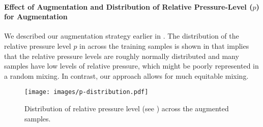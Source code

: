 \documentclass{article}
\begin{document}
\paragraph{Effect of Augmentation and Distribution of Relative Pressure-Level ($p$) for Augmentation}
We described our augmentation strategy earlier in . The distribution of the relative pressure level $p$ in  across the training samples is shown in  that implies that the relative pressure levels are roughly normally distributed and many samples have low levels of relative pressure, which might be poorly represented in a random mixing. In contrast, our approach allows for much equitable mixing.
\begin{figure}[ht]
    \centering
    \texttt{[image: images/p-distribution.pdf]}
    \caption{Distribution of relative pressure level (see ) across the augmented samples.}
    \label{fig:relative_gain_dist}
\end{figure}
\end{document}
